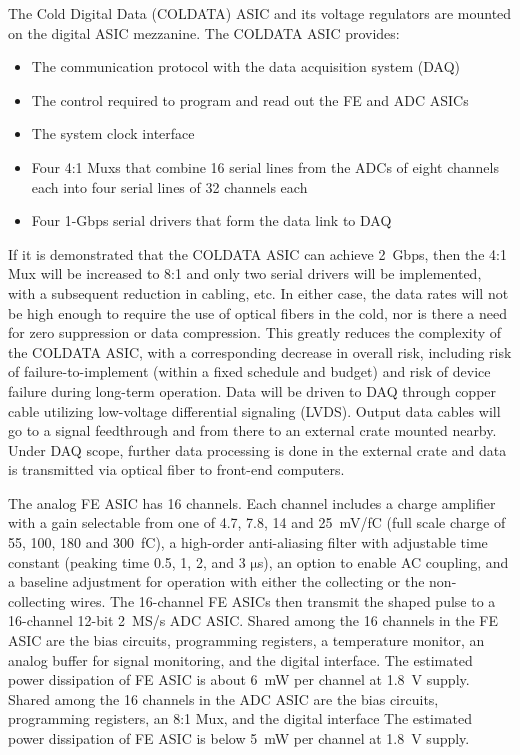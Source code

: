 The Cold Digital Data (COLDATA) ASIC and its voltage regulators are mounted on the digital ASIC mezzanine.
The COLDATA ASIC provides:
\begin{itemize}
\item The communication protocol with the data acquisition system (DAQ)
\item The control required to program and read out the FE and ADC ASICs
\item The system clock interface
\item Four 4:1 Muxs that combine 16 serial lines from the ADCs of eight channels each
into four serial lines of 32 channels each
\item Four 1-Gbps serial drivers that form the data link to DAQ 
\end{itemize}
If it is demonstrated that the COLDATA ASIC can achieve 2~Gbps,
then the 4:1 Mux will be increased to 8:1 and only two serial drivers will be implemented,
with a subsequent reduction in cabling, etc.
In either case, the data rates will not be high enough to require the use of optical fibers in the cold,
nor is there a need for zero suppression or data compression.
This greatly reduces the complexity of the COLDATA ASIC, with a corresponding decrease in overall risk,
including risk of failure-to-implement (within a fixed schedule and budget)
and risk of device failure during long-term operation.
Data will be driven to DAQ through copper cable utilizing low-voltage differential signaling (LVDS).
Output data cables will go to a signal feedthrough and from there to an external crate mounted nearby.
Under DAQ scope, further data processing is done in the external crate
and data is transmitted via optical fiber to front-end computers.

The analog FE ASIC has 16 channels.
Each channel includes a charge amplifier with a gain selectable from one of 4.7, 7.8, 14 and 25~mV/fC
(full scale charge of 55, 100, 180 and 300~fC),
a high-order anti-aliasing filter with adjustable time
constant (peaking time 0.5, 1, 2, and 3 $\mathrm{\mu}$s),
an option to enable AC coupling,
and a baseline adjustment for operation with either the collecting or the non-collecting wires.
The 16-channel FE ASICs then transmit the shaped pulse to a 16-channel 12-bit 2~MS/s ADC ASIC.
Shared among the 16 channels in the FE ASIC are the bias circuits, programming registers,
a temperature monitor, an analog buffer for signal monitoring, and the digital interface.
The estimated power dissipation of FE ASIC is about 6~mW per channel at 1.8~V supply.
Shared among the 16 channels in the ADC ASIC are the bias circuits, programming registers,
an 8:1 Mux, and the digital interface
The estimated power dissipation of FE ASIC is below 5~mW per channel at 1.8~V supply.


